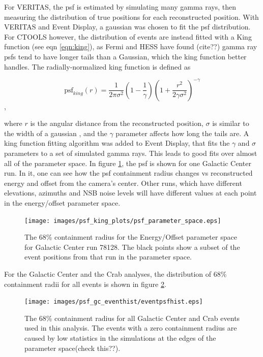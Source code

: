     For VERITAS, the psf is estimated by simulating many gamma rays, then measuring the distribution of true positions for each reconstructed position.
    With VERITAS and Event Display, a gaussian was chosen to fit the psf distribution.
    For CTOOLS however, the distribution of events are instead fitted with a King function (see eqn \ref{eqn:king}), as Fermi and HESS have found (cite??) gamma ray psfs tend to have longer tails than a Gaussian, which the king function better handles.
    The radially-normalized king function is defined as

    \begin{equation} \label{eqn:king}
    \text{psf}_{king}(r) = \frac{1}{2 \pi \sigma^{2} } \left( 1 - \frac{1}{\gamma} \right) \left( 1 + \frac{ r^{2} }{ 2 \gamma \sigma^{2} } \right)^{-\gamma}
    \end{equation},

    where $r$ is the angular distance from the reconstructed position, $\sigma$ is similar to the width of a gaussian , and the $\gamma$ parameter affects how long the tails are.
    A king function fitting algorithm was added to Event Display, that fits the $\gamma$ and $\sigma$ parameters to a set of simulated gamma rays.
    This leads to good fits over almost all of the parameter space.
    In figure \ref{fig:psf_paramspace}, the psf is shown for one Galactic Center run.
    In it, one can see how the psf containment radius changes vs reconstructed energy and offset from the camera's center.
    Other runs, which have different elevations, azimuths and NSB noise levels will have different values at each point in the energy/offset parameter space.

    \begin{figure}[ht]
      \begin{center}
        \texttt{[image: images/psf\_king\_plots/psf\_parameter\_space.eps]}
        \caption[PSF Parameter Space]{The 68\% containment radius for the Energy/Offset parameter space for Galactic Center run 78128. The black points show a subset of the event positions from that run in the parameter space.}\label{fig:psf_paramspace}
      \end{center}
    \end{figure}

    For the Galactic Center and the Crab analyses, the distribution of 68\% containment radii for all events is shown in figure \ref{fig:gc_psf_hist}.

    \begin{figure}[ht]
      \begin{center}
        \texttt{[image: images/psf\_gc\_eventhist/eventpsfhist.eps]}
        \caption[Crab and Galactic Center Event PSFs]{The 68\% containment radius for all Galactic Center and Crab events used in this analysis.  The events with a zero containment radius are caused by low statistics in the simulations at the edges of the parameter space(check this??).}\label{fig:gc_psf_hist}
      \end{center}
    \end{figure}

